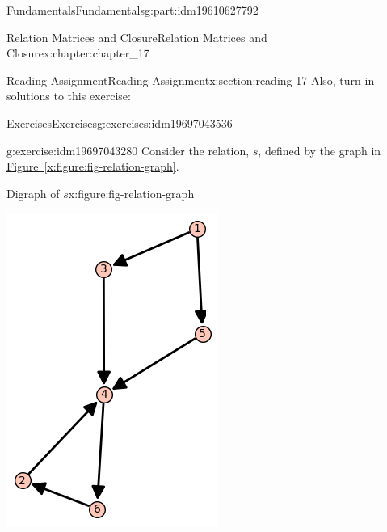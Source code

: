 \documentclass[oneside,10pt,]{book}
\newcommand{\xreffont}{\relax}
\numberwithin{equation}{section}
\begin{document}
\begin{partptx}{Fundamentals}{}{Fundamentals}{}{}{g:part:idm19610627792}
\begin{chapterptx}{Relation Matrices and Closure}{}{Relation Matrices and Closure}{}{}{x:chapter:chapter_17}
\begin{sectionptx}{Reading Assignment}{}{Reading Assignment}{}{}{x:section:reading-17}
Also, turn in solutions to this exercise:%
%
%
\typeout{************************************************}
\typeout{************************************************}
%
\begin{exercises-subsection-numberless}{Exercises}{}{Exercises}{}{}{g:exercises:idm19697043536}
\par\medskip\noindent%
%
\begin{exercisegroup}
\begin{divisionexerciseeg}{1}{}{}{g:exercise:idm19697043280}%
Consider the relation, \(s\), defined by the graph in \hyperref[x:figure:fig-relation-graph]{Figure~{\xreffont\ref{x:figure:fig-relation-graph}}}.%
\begin{figureptx}{Digraph of \(s\)}{x:figure:fig-relation-graph}{}%
\begin{image}{0.25}{0.5}{0.25}%
\includegraphics[width=\linewidth]{images/fig-relation-graph.png}

\end{image}
\end{figureptx}
\end{divisionexerciseeg}
\end{exercisegroup}
\end{exercises-subsection-numberless}
\end{sectionptx}
\end{chapterptx}
\end{partptx}
\end{document}
